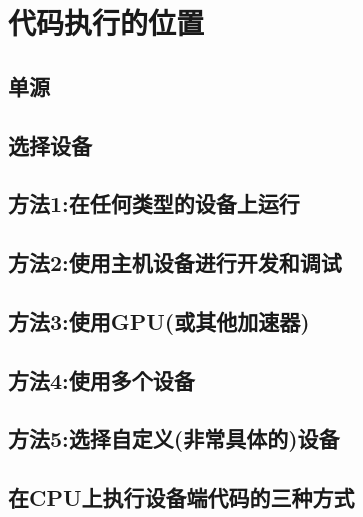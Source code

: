 \documentclass[11pt,a4paper,UTF8]{ctexart}
\begin{document}
	\section{代码执行的位置}
		\subsection{单源}
		\subsection{选择设备}
		\subsection{方法1:在任何类型的设备上运行}
		\subsection{方法2:使用主机设备进行开发和调试}
		\subsection{方法3:使用GPU(或其他加速器)}
		\subsection{方法4:使用多个设备}
		\subsection{方法5:选择自定义(非常具体的)设备}
		\subsection{在CPU上执行设备端代码的三种方式}
\end{document}
